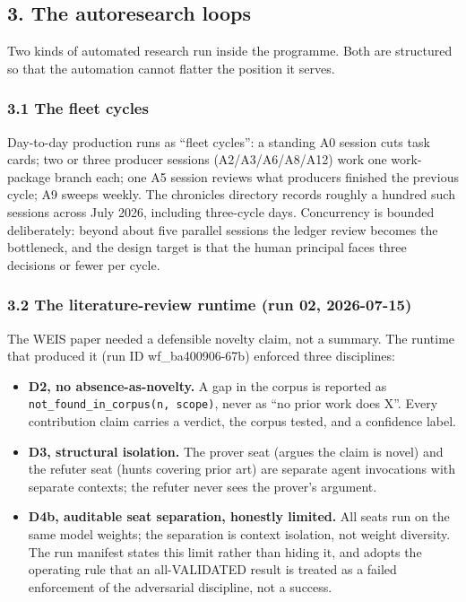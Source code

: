 \documentclass[
  11pt,
]{article}
\providecommand{\tightlist}{%
  \setlength{\itemsep}{0pt}\setlength{\parskip}{0pt}}
\begin{document}
\subsection{3. The autoresearch loops}\label{the-autoresearch-loops}

Two kinds of automated research run inside the programme. Both are
structured so that the automation cannot flatter the position it serves.

\subsubsection{3.1 The fleet cycles}\label{the-fleet-cycles}

Day-to-day production runs as ``fleet cycles'': a standing A0 session
cuts task cards; two or three producer sessions (A2/A3/A6/A8/A12) work
one work-package branch each; one A5 session reviews what producers
finished the previous cycle; A9 sweeps weekly. The chronicles directory
records roughly a hundred such sessions across July 2026, including
three-cycle days. Concurrency is bounded deliberately: beyond about five
parallel sessions the ledger review becomes the bottleneck, and the
design target is that the human principal faces three decisions or fewer
per cycle.

\subsubsection{3.2 The literature-review runtime (run 02,
2026-07-15)}\label{the-literature-review-runtime-run-02-2026-07-15}

The WEIS paper needed a defensible novelty claim, not a summary. The
runtime that produced it (run ID wf\_ba400906-67b) enforced three
disciplines:

\begin{itemize}
\tightlist
\item
  \textbf{D2, no absence-as-novelty.} A gap in the corpus is reported as
  \texttt{not\_found\_in\_corpus(n,\ scope)}, never as ``no prior work
  does X''. Every contribution claim carries a verdict, the corpus
  tested, and a confidence label.
\item
  \textbf{D3, structural isolation.} The prover seat (argues the claim
  is novel) and the refuter seat (hunts covering prior art) are separate
  agent invocations with separate contexts; the refuter never sees the
  prover's argument.
\item
  \textbf{D4b, auditable seat separation, honestly limited.} All seats
  run on the same model weights; the separation is context isolation,
  not weight diversity. The run manifest states this limit rather than
  hiding it, and adopts the operating rule that an all-VALIDATED result
  is treated as a failed enforcement of the adversarial discipline, not
  a success.
\end{itemize}
\end{document}
